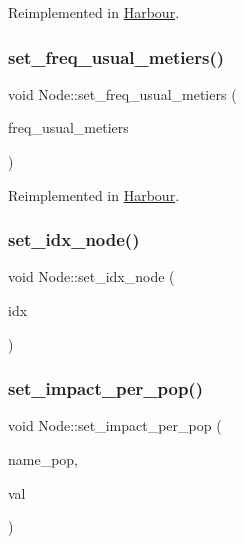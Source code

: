 Reimplemented in \mbox{\hyperlink{class_harbour_a2cdc3a58a3a649f0ba6eed57ca977701}{Harbour}}.

\mbox{\label{class_node_a7f782a14dbabf4b50a30a89e3d686869}} 
\subsubsection{\texorpdfstring{set\_freq\_usual\_metiers()}{set\_freq\_usual\_metiers()}}
{\footnotesize\ttfamily void Node\+::set\+\_\+freq\+\_\+usual\+\_\+metiers (\begin{DoxyParamCaption}\item[{multimap$<$ int, double $>$}]{freq\+\_\+usual\+\_\+metiers }\end{DoxyParamCaption})\hspace{0.3cm}{\ttfamily [virtual]}}



Reimplemented in \mbox{\hyperlink{class_harbour_a9c91424f1d691474c5db9b55a90dc2e6}{Harbour}}.

\mbox{\label{class_node_a39fc0eda83ea54cbf4aeb669ff5f49ae}} 
\subsubsection{\texorpdfstring{set\_idx\_node()}{set\_idx\_node()}}
{\footnotesize\ttfamily void Node\+::set\+\_\+idx\+\_\+node (\begin{DoxyParamCaption}\item[{\mbox{\hyperlink{classtypes_1_1_node_id}{types\+::\+Node\+Id}}}]{idx }\end{DoxyParamCaption})}

\mbox{\label{class_node_a992b667666ced642a56f44a66a5192ed}} 
\subsubsection{\texorpdfstring{set\_impact\_per\_pop()}{set\_impact\_per\_pop()}}
{\footnotesize\ttfamily void Node\+::set\+\_\+impact\+\_\+per\+\_\+pop (\begin{DoxyParamCaption}\item[{int}]{name\+\_\+pop,  }\item[{double}]{val }\end{DoxyParamCaption})}

